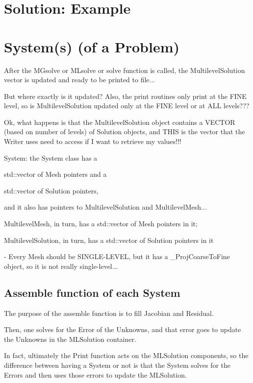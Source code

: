 \documentclass[10pt]{book}
\begin{document}
  
 \chapter{Solution: Example}
  

  \chapter{System(s) (of a Problem)}


  
     After the MGsolve or MLsolve or solve function is called,
   the MultilevelSolution vector is updated and ready to be printed to file...
   
   But where exactly is it updated?
   Also, the print routines only print at the FINE level,
   so is MultilevelSolution updated only at the FINE level or at ALL levels???
   
   Ok, what happens is that the MultilevelSolution object contains a VECTOR (based on number of levels) of Solution objects,
   and THIS is the vector that the Writer uses need to access if I want to retrieve my values!!!
   
   
   System: the System class has a 
   
   std::vector of Mesh pointers and a 
   
   std::vector of Solution pointers,
   
   and it also has pointers to MultilevelSolution and MultilevelMesh...
   
   MultilevelMesh, in turn, has a std::vector of Mesh pointers in it;
   
   MultilevelSolution, in turn, has a std::vector of Solution pointers in it
   
   
   - Every Mesh should be SINGLE-LEVEL, but it has a \_ProjCoarseToFine object, so it is not really single-level...
      

      
   \section{Assemble function of each System}
   
    The purpose of the assemble function is to fill Jacobian and Residual.
    
    Then, one solves for the Error of the Unknowns, and that error
    goes to update the Unknowns in the MLSolution container.
    
     In fact, ultimately the Print function acts on the MLSolution components,
     so the difference between having a System or not 
     is that the System solves for the Errors and then uses those errors to update the MLSolution.
   
\end{document}
